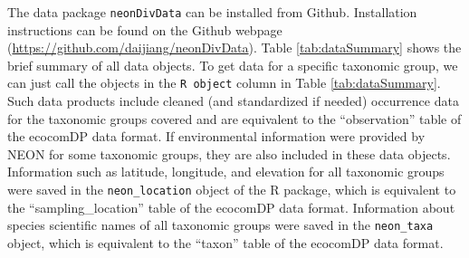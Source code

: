 \documentclass[
  12pt,
]{article}
\begin{document}
The data package \texttt{neonDivData} can be installed from Github. Installation instructions can be found on the Github webpage (\url{https://github.com/daijiang/neonDivData}). Table \ref{tab:dataSummary} shows the brief summary of all data objects. To get data for a specific taxonomic group, we can just call the objects in the \texttt{R\ object} column in Table \ref{tab:dataSummary}. Such data products include cleaned (and standardized if needed) occurrence data for the taxonomic groups covered and are equivalent to the ``observation'' table of the ecocomDP data format. If environmental information were provided by NEON for some taxonomic groups, they are also included in these data objects. Information such as latitude, longitude, and elevation for all taxonomic groups were saved in the \texttt{neon\_location} object of the R package, which is equivalent to the ``sampling\_location'' table of the ecocomDP data format. Information about species scientific names of all taxonomic groups were saved in the \texttt{neon\_taxa} object, which is equivalent to the ``taxon'' table of the ecocomDP data format.
\end{document}
